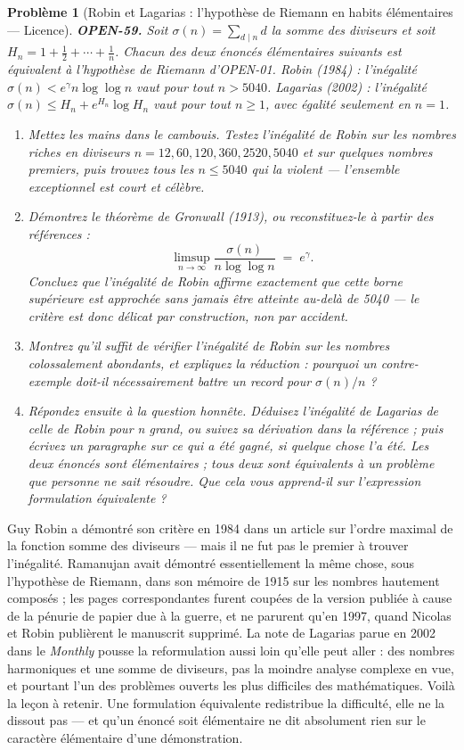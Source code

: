 \documentclass[11pt]{article}
\newtheorem{problem}{Problème}
\begin{document}
\begin{problem}[{Robin et Lagarias : l'hypothèse de Riemann en habits élémentaires --- Licence}]
\textbf{OPEN-59.} Soit $ \sigma(n) = \sum_{d \mid n} d $ la somme des diviseurs et
soit $ H_n = 1 + \tfrac12 + \cdots + \tfrac1n $. Chacun des deux énoncés élémentaires
suivants est \textit{équivalent} à l'hypothèse de Riemann d'OPEN-01. Robin (1984) :
l'inégalité $ \sigma(n) < e^{\gamma} n \log \log n $ vaut pour tout $ n > 5040 $.
Lagarias (2002) : l'inégalité $ \sigma(n) \le H_n + e^{H_n} \log H_n $ vaut pour tout
$ n \ge 1 $, avec égalité seulement en $ n = 1 $.
\begin{enumerate}
\item[(a)] Mettez les mains dans le cambouis. Testez l'inégalité de Robin sur les nombres riches
en diviseurs $ n = 12, 60, 120, 360, 2520, 5040 $ et sur quelques nombres premiers, puis
trouvez tous les $ n \le 5040 $ qui la violent --- l'ensemble exceptionnel est court et
célèbre.
\item[(b)] Démontrez le théorème de Gronwall (1913), ou reconstituez-le à partir des références :
\[ \limsup_{n \to \infty} \frac{\sigma(n)}{n \log \log n} \;=\; e^{\gamma}. \]
Concluez que l'inégalité de Robin affirme exactement que cette borne supérieure est
approchée sans jamais être atteinte au-delà de 5040 --- le critère est donc délicat par
construction, non par accident.
\item[(c)] Montrez qu'il suffit de vérifier l'inégalité de Robin sur les nombres colossalement
abondants, et expliquez la réduction : pourquoi un contre-exemple doit-il nécessairement
battre un record pour $ \sigma(n)/n $ ?
\item[(d)] Répondez ensuite à la question honnête. Déduisez l'inégalité de Lagarias de celle de
Robin pour n grand, ou suivez sa dérivation dans la référence ; puis écrivez un paragraphe
sur ce qui a été gagné, si quelque chose l'a été. Les deux énoncés sont élémentaires ;
tous deux sont équivalents à un problème que personne ne sait résoudre. Que cela vous
apprend-il sur l'expression \og{} formulation équivalente \fg{} ?
\end{enumerate}

\end{problem}

\noindent Guy Robin a démontré son critère en 1984 dans un article sur l'ordre
maximal de la fonction somme des diviseurs --- mais il ne fut pas le premier à trouver
l'inégalité. Ramanujan avait démontré essentiellement la même chose, sous l'hypothèse de
Riemann, dans son mémoire de 1915 sur les nombres hautement composés ; les pages
correspondantes furent coupées de la version publiée à cause de la pénurie de papier due à
la guerre, et ne parurent qu'en 1997, quand Nicolas et Robin publièrent le manuscrit
supprimé. La note de Lagarias parue en 2002 dans le \textit{Monthly} pousse la reformulation
aussi loin qu'elle peut aller : des nombres harmoniques et une somme de diviseurs, pas la
moindre analyse complexe en vue, et pourtant l'un des problèmes ouverts les plus difficiles
des mathématiques. Voilà la leçon à retenir. Une formulation équivalente redistribue la
difficulté, elle ne la dissout pas --- et qu'un énoncé soit élémentaire ne dit absolument
rien sur le caractère élémentaire d'une démonstration.
\end{document}

